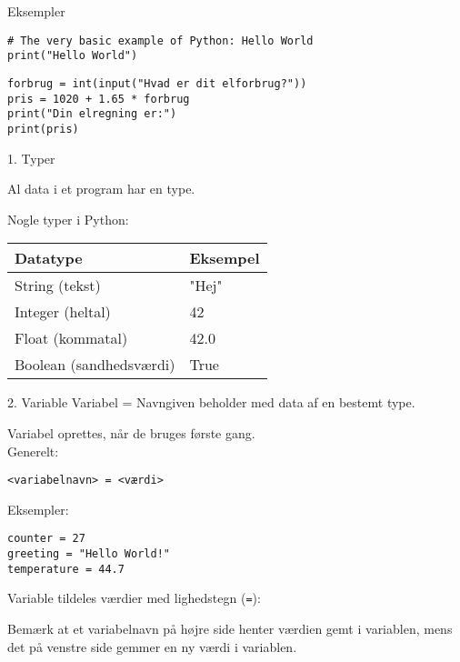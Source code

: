 \documentclass[10pt]{beamer}
\begin{document}

\begin{frame}[fragile]{Eksempler}
	\begin{lstlisting}[style=python]
# The very basic example of Python: Hello World
print("Hello World")
	\end{lstlisting}
	\medskip
	\begin{lstlisting}[style=python]
forbrug = int(input("Hvad er dit elforbrug?"))
pris = 1020 + 1.65 * forbrug
print("Din elregning er:")
print(pris)
	\end{lstlisting}
\end{frame}


\begin{frame}{1. Typer}

Al data i et program har en \alert{type}.

\medskip
Nogle typer i Python:
\medskip

\begin{center}
	\begin{tabular}{ll}
		\hline
		Datatype						&		Eksempel 	\\ \hline \hline
		String (tekst)					&		"Hej"		\\
		Integer (heltal)				&		42			\\
		Float (kommatal)				&		42.0		\\
		Boolean	(sandhedsværdi)			&		True		\\
	\end{tabular}
\end{center}
\end{frame}


\begin{frame}[fragile]{2. Variable}
Variabel = Navngiven beholder med data af en bestemt type.

\medskip
Variabel oprettes, når de bruges første gang.\\
Generelt:
\begin{lstlisting}[style=python]
<variabelnavn> = <værdi>
\end{lstlisting}

Eksempler:
\begin{lstlisting}[style=python]
counter = 27
greeting = "Hello World!"
temperature = 44.7
\end{lstlisting}


Variable tildeles værdier med lighedstegn (\texttt{=}):

Bemærk at et variabelnavn på \alert{højre} side henter værdien gemt i
variablen, mens det på \alert{venstre} side gemmer en ny værdi i variablen.

\end{frame}
\end{document}
